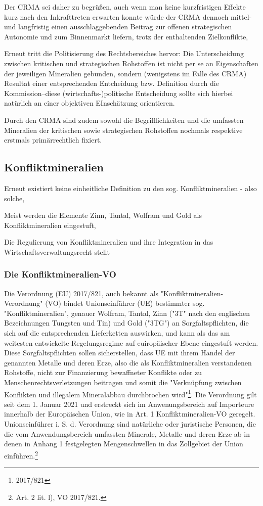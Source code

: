 \documentclass[12pt,a4paper,oneside]{book} %
\begin{document}
	Der CRMA sei daher zu begrüßen, auch wenn man keine kurzfristigen Effekte kurz nach den Inkrafttreten erwarten konnte würde der CRMA dennoch mittel- und langfristig einen ausschlaggebenden Beitrag zur offenen strategischen Autonomie und zum Binnenmarkt liefern, trotz der enthaltenden Zielkonflikte,\autocite{Schäffer/Hach, ZRP 2023, 210f.}
	
	Erneut tritt die Politisierung des Rechtsbereiches hervor: Die Unterscheidung zwischen kritischen und strategischen Rohstoffen ist nicht per se an Eigenschaften der jeweiligen Mineralien gebunden, sondern (wenigstens im Falle des CRMA) Resultat einer entsprechenden Entcheidung bzw. Definition durch die Kommission--diese (wirtschafts-)politische Entscheidung sollte sich hierbei natürlich an einer objektiven EInschätzung orientieren.\autocite{Frau 2024, NVwZ, 1874, 1876}
	
	Durch den CRMA sind zudem sowohl die Begrifflichkeiten und die umfassten Mineralien der kritischen sowie strategischen Rohstoffen nochmals respektive erstmals primärrechtlich fixiert.
	
	
	\subsection{Konfliktmineralien}
	Erneut existiert keine einheitliche Definition zu den sog. Konfliktmineralien - also solche, 
	
	Meist werden die Elemente Zinn, Tantal, Wolfram und Gold als Konfliktmineralien eingestuft, 
	
	Die Regulierung von Konfliktmineralien und ihre Integration in das Wirtschaftsverwaltungsrecht stellt 
	
	\subsubsection{Die Konfliktmineralien-VO}
	Die Verordnung (EU) 2017/821, auch bekannt als "Konfliktmineralien-Verordnung" (VO) bindet Unionseinführer (UE) bestimmter sog. "Konfliktmineralien", genauer Wolfram, Tantal, Zinn ("3T" nach den englischen Bezeichnungen Tungsten und Tin) und Gold ("3TG") an Sorgfaltspflichten, die sich auf die entsprechenden Lieferketten auswirken, und kann als das am weitesten entwickelte Regelungsregime auf euiropäischer Ebene eingestuft werden\autocite{Kalls, ZfPW 2024, 181, 199}. Diese Sorgfaltspflichten sollen sicherstellen, dass UE mit ihrem Handel der genannten Metalle und deren Erze, also die als Konfliktmineralien verstandenen Rohstoffe, nicht zur Finanzierung bewaffneter Konflikte oder zu Menschenrechtsverletzungen beitragen und somit die "Verknüpfung zwischen Konflikten und illegalem Mineralabbau durchbrochen wird"\footnote{2017/821}. Die Verordnung gilt seit dem 1. Januar 2021 und erstreckt sich im Anwenungsbereich auf Importeure innerhalb der Europäischen Union, wie in Art. 1 Konfliktmineralien-VO geregelt. Unionseinführer i. S. d. Verordnung sind natürliche oder juristische Personen, die die vom Anwendungsbereich umfassten Minerale, Metalle und deren Erze ab in denen in Anhang 1 festgelegten Mengenschwellen in das Zollgebiet der Union einführen.\footnote{Art. 2 lit. l), VO 2017/821.} 
	
\end{document}
